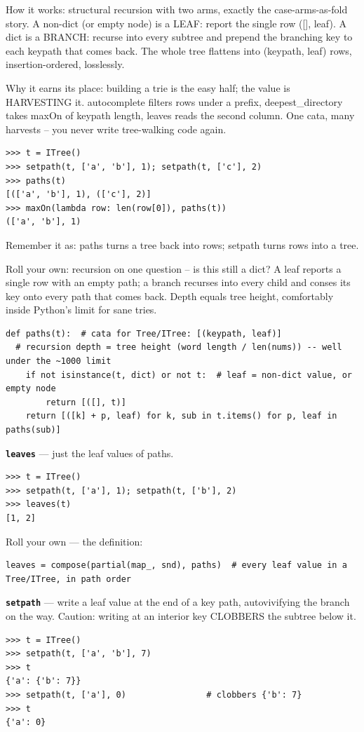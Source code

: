 \documentclass[10pt,letterpaper]{article}
\begin{document}
How it works: structural recursion with two arms, exactly the case-arms-as-fold story. A non-dict (or empty node) is a LEAF: report the single row ([], leaf). A dict is a BRANCH: recurse into every subtree and prepend the branching key to each keypath that comes back. The whole tree flattens into (keypath, leaf) rows, insertion-ordered, losslessly.


Why it earns its place: building a trie is the easy half; the value is HARVESTING it. autocomplete filters rows under a prefix, deepest\_directory takes maxOn of keypath length, leaves reads the second column. One cata, many harvests -- you never write tree-walking code again.

\begin{lstlisting}[style=ex]
>>> t = ITree()
>>> setpath(t, ['a', 'b'], 1); setpath(t, ['c'], 2)
>>> paths(t)
[(['a', 'b'], 1), (['c'], 2)]
>>> maxOn(lambda row: len(row[0]), paths(t))
(['a', 'b'], 1)
\end{lstlisting}

Remember it as: paths turns a tree back into rows; setpath turns rows into a tree.


Roll your own: recursion on one question -- is this still a dict? A leaf reports a single row with an empty path; a branch recurses into every child and conses its key onto every path that comes back. Depth equals tree height, comfortably inside Python's limit for sane tries.

\begin{lstlisting}[style=ex]
def paths(t):  # cata for Tree/ITree: [(keypath, leaf)]
  # recursion depth = tree height (word length / len(nums)) -- well under the ~1000 limit
    if not isinstance(t, dict) or not t:  # leaf = non-dict value, or empty node
        return [([], t)]
    return [([k] + p, leaf) for k, sub in t.items() for p, leaf in paths(sub)]
\end{lstlisting}
\textbf{\texttt{leaves}} --- just the leaf values of paths.
\begin{lstlisting}[style=ex]
>>> t = ITree()
>>> setpath(t, ['a'], 1); setpath(t, ['b'], 2)
>>> leaves(t)
[1, 2]
\end{lstlisting}

Roll your own --- the definition:

\begin{lstlisting}[style=ex]
leaves = compose(partial(map_, snd), paths)  # every leaf value in a Tree/ITree, in path order
\end{lstlisting}
\textbf{\texttt{setpath}} --- write a leaf value at the end of a key path, autovivifying the branch on the way. Caution: writing at an interior key CLOBBERS the subtree below it.
\begin{lstlisting}[style=ex]
>>> t = ITree()
>>> setpath(t, ['a', 'b'], 7)
>>> t
{'a': {'b': 7}}
>>> setpath(t, ['a'], 0)                # clobbers {'b': 7}
>>> t
{'a': 0}
\end{lstlisting}
\end{document}
